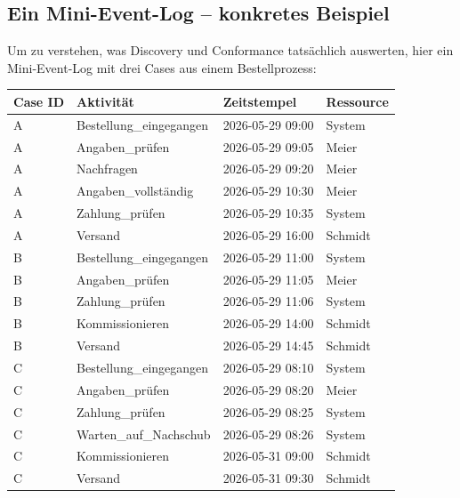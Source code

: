 \documentclass[11pt,a4paper,oneside]{article}
\begin{document}
\subsection{Ein Mini-Event-Log -- konkretes Beispiel}

Um zu verstehen, was Discovery und Conformance tatsächlich auswerten, hier ein Mini-Event-Log mit drei Cases aus einem Bestell­prozess:

\begin{tabularx}{\linewidth}{@{}lXll@{}}
\toprule
\textbf{Case ID} & \textbf{Aktivität} & \textbf{Zeitstempel} & \textbf{Ressource} \\
\midrule
A & Bestellung\_eingegangen   & 2026-05-29 09:00 & System  \\
A & Angaben\_prüfen           & 2026-05-29 09:05 & Meier   \\
A & Nachfragen                 & 2026-05-29 09:20 & Meier   \\
A & Angaben\_vollständig      & 2026-05-29 10:30 & Meier   \\
A & Zahlung\_prüfen           & 2026-05-29 10:35 & System  \\
A & Versand                    & 2026-05-29 16:00 & Schmidt \\
\addlinespace
B & Bestellung\_eingegangen   & 2026-05-29 11:00 & System  \\
B & Angaben\_prüfen           & 2026-05-29 11:05 & Meier   \\
B & Zahlung\_prüfen           & 2026-05-29 11:06 & System  \\
B & Kommissionieren            & 2026-05-29 14:00 & Schmidt \\
B & Versand                    & 2026-05-29 14:45 & Schmidt \\
\addlinespace
C & Bestellung\_eingegangen   & 2026-05-29 08:10 & System  \\
C & Angaben\_prüfen           & 2026-05-29 08:20 & Meier   \\
C & Zahlung\_prüfen           & 2026-05-29 08:25 & System  \\
C & Warten\_auf\_Nachschub    & 2026-05-29 08:26 & System  \\
C & Kommissionieren            & 2026-05-31 09:00 & Schmidt \\
C & Versand                    & 2026-05-31 09:30 & Schmidt \\
\bottomrule
\end{tabularx}

\medskip
\end{document}
